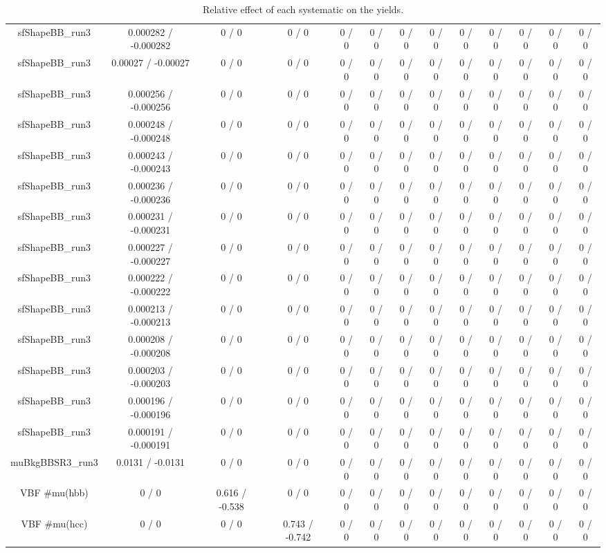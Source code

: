 \documentclass[10pt]{article}
\begin{document}
\begin{table}[htbp]
\begin{center}
\begin{tabular}{|c|c|c|c|c|c|c|c|c|c|c|c|c|}
  sfShapeBB_run3 & 0.000282 / -0.000282 & 0 / 0 & 0 / 0 & 0 / 0 & 0 / 0 & 0 / 0 & 0 / 0 & 0 / 0 & 0 / 0 & 0 / 0 & 0 / 0 & 0 / 0 \\ 
  sfShapeBB_run3 & 0.00027 / -0.00027 & 0 / 0 & 0 / 0 & 0 / 0 & 0 / 0 & 0 / 0 & 0 / 0 & 0 / 0 & 0 / 0 & 0 / 0 & 0 / 0 & 0 / 0 \\ 
  sfShapeBB_run3 & 0.000256 / -0.000256 & 0 / 0 & 0 / 0 & 0 / 0 & 0 / 0 & 0 / 0 & 0 / 0 & 0 / 0 & 0 / 0 & 0 / 0 & 0 / 0 & 0 / 0 \\ 
  sfShapeBB_run3 & 0.000248 / -0.000248 & 0 / 0 & 0 / 0 & 0 / 0 & 0 / 0 & 0 / 0 & 0 / 0 & 0 / 0 & 0 / 0 & 0 / 0 & 0 / 0 & 0 / 0 \\ 
  sfShapeBB_run3 & 0.000243 / -0.000243 & 0 / 0 & 0 / 0 & 0 / 0 & 0 / 0 & 0 / 0 & 0 / 0 & 0 / 0 & 0 / 0 & 0 / 0 & 0 / 0 & 0 / 0 \\ 
  sfShapeBB_run3 & 0.000236 / -0.000236 & 0 / 0 & 0 / 0 & 0 / 0 & 0 / 0 & 0 / 0 & 0 / 0 & 0 / 0 & 0 / 0 & 0 / 0 & 0 / 0 & 0 / 0 \\ 
  sfShapeBB_run3 & 0.000231 / -0.000231 & 0 / 0 & 0 / 0 & 0 / 0 & 0 / 0 & 0 / 0 & 0 / 0 & 0 / 0 & 0 / 0 & 0 / 0 & 0 / 0 & 0 / 0 \\ 
  sfShapeBB_run3 & 0.000227 / -0.000227 & 0 / 0 & 0 / 0 & 0 / 0 & 0 / 0 & 0 / 0 & 0 / 0 & 0 / 0 & 0 / 0 & 0 / 0 & 0 / 0 & 0 / 0 \\ 
  sfShapeBB_run3 & 0.000222 / -0.000222 & 0 / 0 & 0 / 0 & 0 / 0 & 0 / 0 & 0 / 0 & 0 / 0 & 0 / 0 & 0 / 0 & 0 / 0 & 0 / 0 & 0 / 0 \\ 
  sfShapeBB_run3 & 0.000213 / -0.000213 & 0 / 0 & 0 / 0 & 0 / 0 & 0 / 0 & 0 / 0 & 0 / 0 & 0 / 0 & 0 / 0 & 0 / 0 & 0 / 0 & 0 / 0 \\ 
  sfShapeBB_run3 & 0.000208 / -0.000208 & 0 / 0 & 0 / 0 & 0 / 0 & 0 / 0 & 0 / 0 & 0 / 0 & 0 / 0 & 0 / 0 & 0 / 0 & 0 / 0 & 0 / 0 \\ 
  sfShapeBB_run3 & 0.000203 / -0.000203 & 0 / 0 & 0 / 0 & 0 / 0 & 0 / 0 & 0 / 0 & 0 / 0 & 0 / 0 & 0 / 0 & 0 / 0 & 0 / 0 & 0 / 0 \\ 
  sfShapeBB_run3 & 0.000196 / -0.000196 & 0 / 0 & 0 / 0 & 0 / 0 & 0 / 0 & 0 / 0 & 0 / 0 & 0 / 0 & 0 / 0 & 0 / 0 & 0 / 0 & 0 / 0 \\ 
  sfShapeBB_run3 & 0.000191 / -0.000191 & 0 / 0 & 0 / 0 & 0 / 0 & 0 / 0 & 0 / 0 & 0 / 0 & 0 / 0 & 0 / 0 & 0 / 0 & 0 / 0 & 0 / 0 \\ 
  muBkgBBSR3_run3 & 0.0131 / -0.0131 & 0 / 0 & 0 / 0 & 0 / 0 & 0 / 0 & 0 / 0 & 0 / 0 & 0 / 0 & 0 / 0 & 0 / 0 & 0 / 0 & 0 / 0 \\ 
  VBF #mu(hbb) & 0 / 0 & 0.616 / -0.538 & 0 / 0 & 0 / 0 & 0 / 0 & 0 / 0 & 0 / 0 & 0 / 0 & 0 / 0 & 0 / 0 & 0 / 0 & 0 / 0 \\ 
  VBF #mu(hcc) & 0 / 0 & 0 / 0 & 0.743 / -0.742 & 0 / 0 & 0 / 0 & 0 / 0 & 0 / 0 & 0 / 0 & 0 / 0 & 0 / 0 & 0 / 0 & 0 / 0 \\ 
\hline 
\end{tabular} 
\caption{Relative effect of each systematic on the yields.} 
\end{center} 
\end{table} 
\end{document}
